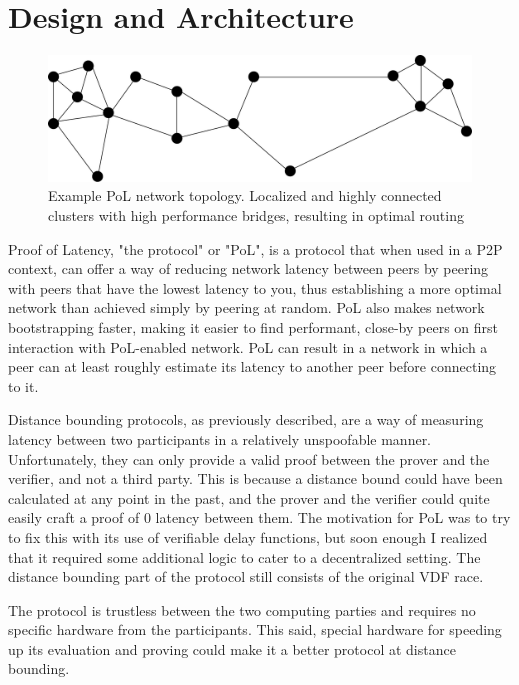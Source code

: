 \chapter{Design and Architecture}
\label{Proof of Latency}
\begin{figure}
	\includegraphics[width=\textwidth]{pictures/pol_topology.pdf}
	\caption{Example PoL network topology. Localized and highly connected clusters with high performance bridges, resulting in optimal routing}
	\label{PoL Example Topology}
\end{figure}

Proof of Latency, "the protocol" or "PoL", is a protocol that when used in a P2P context, can offer a way of reducing network latency between peers by peering with peers that have the lowest latency to you, thus establishing a more optimal network than achieved simply by peering at random. PoL also makes network bootstrapping faster, making it easier to find performant, close-by peers on first interaction with PoL-enabled network. PoL can result in a network in which a peer can at least roughly estimate its latency to another peer before connecting to it.

Distance bounding protocols, as previously described, are a way of measuring latency between two participants in a relatively unspoofable manner. Unfortunately, they can only provide a valid proof between the prover and the verifier, and not a third party. This is because a distance bound could have been calculated at any point in the past, and the prover and the verifier could quite easily craft a proof of 0 latency between them. The motivation for PoL was to try to fix this with its use of verifiable delay functions, but soon enough I realized that it required some additional logic to cater to a decentralized setting. The distance bounding part of the protocol still consists of the original VDF race.

The protocol is trustless between the two computing parties and requires no specific hardware from the participants. This said, special hardware for speeding up its evaluation and proving could make it a better protocol at distance bounding.

